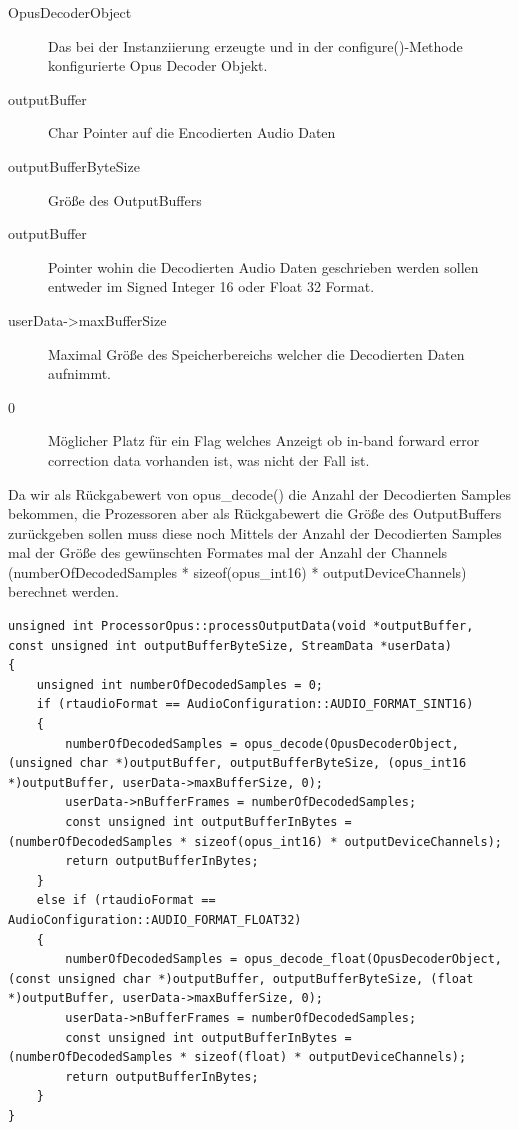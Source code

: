 \begin{description}
\item[OpusDecoderObject] Das bei der Instanziierung erzeugte und in der configure()-Methode konfigurierte Opus Decoder Objekt.
\item[outputBuffer] Char Pointer auf die Encodierten Audio Daten
\item[outputBufferByteSize] Größe des OutputBuffers
\item[outputBuffer] Pointer wohin die Decodierten Audio Daten geschrieben werden sollen entweder im Signed Integer 16 oder Float 32 Format.
\item[userData->maxBufferSize] Maximal Größe des Speicherbereichs welcher die Decodierten Daten aufnimmt.
\item[0] Möglicher Platz für ein Flag welches Anzeigt ob in-band forward error correction data vorhanden ist, was nicht der Fall ist.
\end{description}

Da wir als Rückgabewert von opus\_decode() die Anzahl der Decodierten Samples bekommen, die Prozessoren aber als Rückgabewert die Größe des OutputBuffers zurückgeben sollen muss diese noch Mittels der Anzahl der Decodierten Samples mal der Größe des gewünschten Formates mal der Anzahl der Channels (numberOfDecodedSamples * sizeof(opus\_int16) * outputDeviceChannels) berechnet werden.

\begin{lstlisting}[caption={Decodieren von Audio Daten mittels Opus},label={Code:Opus}]
unsigned int ProcessorOpus::processOutputData(void *outputBuffer, const unsigned int outputBufferByteSize, StreamData *userData)
{
    unsigned int numberOfDecodedSamples = 0;
    if (rtaudioFormat == AudioConfiguration::AUDIO_FORMAT_SINT16)
    {
        numberOfDecodedSamples = opus_decode(OpusDecoderObject, (unsigned char *)outputBuffer, outputBufferByteSize, (opus_int16 *)outputBuffer, userData->maxBufferSize, 0);
        userData->nBufferFrames = numberOfDecodedSamples;
        const unsigned int outputBufferInBytes = (numberOfDecodedSamples * sizeof(opus_int16) * outputDeviceChannels);
        return outputBufferInBytes;
    }
    else if (rtaudioFormat == AudioConfiguration::AUDIO_FORMAT_FLOAT32)
    {
        numberOfDecodedSamples = opus_decode_float(OpusDecoderObject, (const unsigned char *)outputBuffer, outputBufferByteSize, (float *)outputBuffer, userData->maxBufferSize, 0);
        userData->nBufferFrames = numberOfDecodedSamples;
        const unsigned int outputBufferInBytes = (numberOfDecodedSamples * sizeof(float) * outputDeviceChannels);
        return outputBufferInBytes;
    }
}
\end{lstlisting}

